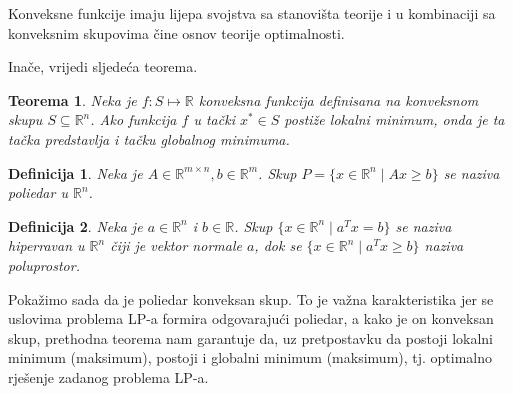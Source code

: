 \documentclass[a4paper, utf8, 11pt, colorlinks]{book}
\newtheorem{definition}{Definicija}
\newtheorem{thm}{Teorema}
\newenvironment{proof}{{Dokaz:}}{\hfill$\square$}
\begin{document}
Konveksne funkcije imaju lijepa svojstva sa stanovišta teorije i u kombinaciji sa konveksnim skupovima čine osnov  teorije optimalnosti. 

Inače, vrijedi sljedeća teorema.
\begin{thm}
  Neka je $f : S \mapsto \mathbb{R}$ konveksna funkcija definisana na konveksnom skupu $S \subseteq \mathbb{R}^n$. Ako funkcija $f$ u tački $x^* \in S$
 postiže lokalni minimum, onda je ta tačka predstavlja i tačku globalnog minimuma.
\end{thm}

\begin{definition}
   Neka je $A \in \mathbb{R}^{m \times n}, b \in \mathbb{R}^m$. Skup $P=\{x \in \mathbb{R}^n \mid Ax \geq b\}$ se naziva poliedar u $\mathbb{R}^n$. 
\end{definition}
\begin{definition}
   Neka je $a\in \mathbb{R}^n $ i $b \in \mathbb{R}$. Skup $\{ x \in \mathbb{R}^n \mid a^T x = b \}$ se naziva hiperravan u $\mathbb{R}^n$ čiji je vektor  normale $a$, dok se $\{ x \in \mathbb{R}^n \mid a^T x \geq b \}$ naziva poluprostor. 
\end{definition}
Pokažimo sada da je poliedar konveksan skup. To je važna karakteristika jer se uslovima problema LP-a formira odgovarajući poliedar, a kako je on konveksan skup, prethodna teorema nam garantuje da, uz pretpostavku da postoji lokalni minimum (maksimum), postoji  i globalni minimum (maksimum), tj. optimalno rješenje zadanog problema LP-a.
\end{document}
